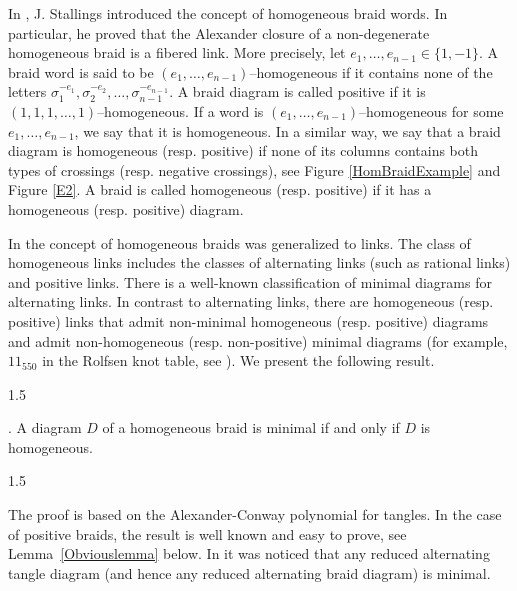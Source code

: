 \documentclass[11pt]{amsart}
\theoremstyle{plain}
\theoremstyle{definition}
\numberwithin{equation}{section}
\begin{document}
In \cite{Stallings}, J. Stallings introduced the concept of homogeneous braid words. In particular, he proved that the Alexander closure of a non-degenerate homogeneous braid is a fibered link. More precisely, let $e_1, \ldots, e_{n-1} \in \{1,-1\}$. A braid word is said to be $(e_1,\ldots,e_{n-1})$--homogeneous if it contains none of the letters $\sigma_1^{-e_1}, \sigma_2^{-e_2}, \ldots, \sigma_{n-1}^{-e_{n-1}}$. A braid diagram is called positive if it is $(1,1,1, \ldots, 1)$--homogeneous. If a word is $(e_1,\ldots,e_{n-1})$--homogeneous for some $e_1, \ldots, e_{n-1}$, we say that it is homogeneous. In a similar way, we say that a braid diagram is homogeneous (resp. positive) if none of its columns contains both types of crossings (resp. negative crossings), see Figure \ref{HomBraidExample} and Figure \ref{E2}. A braid is called homogeneous (resp. positive) if it has a homogeneous (resp. positive) diagram.

In \cite{Cromwell} the concept of homogeneous braids was generalized to links. The class of homogeneous links includes the classes of alternating links (such as rational links) and positive links. There is a well-known classification of minimal diagrams for alternating links. In contrast to alternating links, there are homogeneous (resp. positive) links that admit non-minimal homogeneous (resp. positive) diagrams and admit non-homogeneous (resp. non-positive) minimal diagrams (for example, $11_{550}$ in the Rolfsen knot table, see \cite{Stoimenow}). We present the following result.

\begin{spacing}{1.5}
\end{spacing}

. A diagram $D$ of a homogeneous braid is minimal if and only if $D$ is homogeneous.

\begin{spacing}{1.5}
\end{spacing}

The proof is based on the Alexander-Conway polynomial for tangles. In the case of positive braids, the result is well known and easy to prove, see Lemma~\ref{Obviouslemma} below. In \cite{Turaev1990} it was noticed that any reduced alternating tangle diagram (and hence any reduced alternating braid diagram) is minimal.
\end{document}
